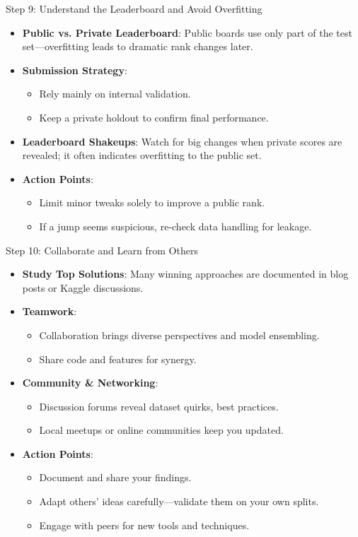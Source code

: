 \documentclass[ignorenonframetext,]{beamer}
\begin{document}
\begin{frame}{Step 9: Understand the Leaderboard and Avoid Overfitting}
\begin{itemize}
  \item \textbf{Public vs. Private Leaderboard}: Public boards use only part of the test set—overfitting leads to dramatic rank changes later.
  \item \textbf{Submission Strategy}:
    \begin{itemize}
      \item Rely mainly on internal validation.
      \item Keep a private holdout to confirm final performance.
    \end{itemize}
  \item \textbf{Leaderboard Shakeups}: Watch for big changes when private scores are revealed; it often indicates overfitting to the public set.
  \item \textbf{Action Points}:
    \begin{itemize}
      \item Limit minor tweaks solely to improve a public rank.
      \item If a jump seems suspicious, re-check data handling for leakage.
    \end{itemize}
\end{itemize}
\end{frame}

\begin{frame}{Step 10: Collaborate and Learn from Others}
\begin{itemize}
  \item \textbf{Study Top Solutions}: Many winning approaches are documented in blog posts or Kaggle discussions.
  \item \textbf{Teamwork}:
    \begin{itemize}
      \item Collaboration brings diverse perspectives and model ensembling.
      \item Share code and features for synergy.
    \end{itemize}
  \item \textbf{Community \& Networking}:
    \begin{itemize}
      \item Discussion forums reveal dataset quirks, best practices.
      \item Local meetups or online communities keep you updated.
    \end{itemize}
  \item \textbf{Action Points}:
    \begin{itemize}
      \item Document and share your findings.
      \item Adapt others’ ideas carefully—validate them on your own splits.
      \item Engage with peers for new tools and techniques.
    \end{itemize}
\end{itemize}
\end{frame}
\end{document}
